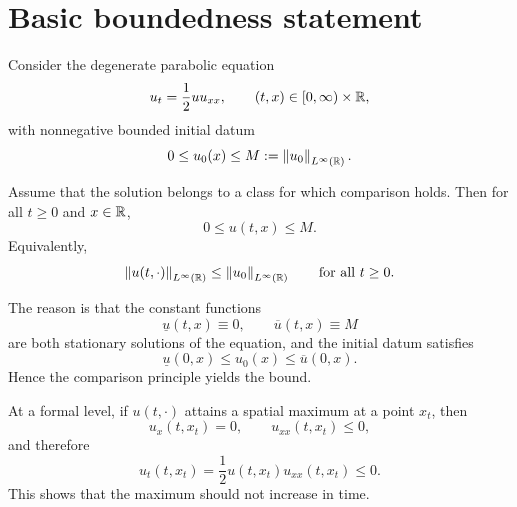 \section{Basic boundedness statement}

Consider the degenerate parabolic equation
\[
    u_t = \frac12 u u_{xx}, \qquad (t,x)\in [0,\infty)\times \mathbb{R},
\]
with nonnegative bounded initial datum
\[
    0\le u_0(x) \le M := \left\lVert u_0 \right\rVert_{L^{\infty}(\mathbb{R})}.
\]

\begin{proposition}
Assume that the solution belongs to a class for which comparison holds. Then for all $t\ge 0$ and $x\in \mathbb{R}$,
\[
    0 \le u(t,x) \le M.
\]
Equivalently,
\[
    \left\lVert u(t,\cdot) \right\rVert_{L^{\infty}(\mathbb{R})} \le \left\lVert u_0 \right\rVert_{L^{\infty}(\mathbb{R})}
    \qquad \text{for all } t\ge 0.
\]
\end{proposition}

The reason is that the constant functions
\[
    \underline{u}(t,x)\equiv 0,
    \qquad
    \overline{u}(t,x)\equiv M
\]
are both stationary solutions of the equation, and the initial datum satisfies
\[
    \underline{u}(0,x) \le u_0(x) \le \overline{u}(0,x).
\]
Hence the comparison principle yields the bound.

\begin{remark}
At a formal level, if $u(t,\cdot)$ attains a spatial maximum at a point $x_t$, then
\[
    u_x(t,x_t)=0, \qquad u_{xx}(t,x_t)\le 0,
\]
and therefore
\[
    u_t(t,x_t)=\frac12 u(t,x_t)u_{xx}(t,x_t)\le 0.
\]
This shows that the maximum should not increase in time.
\end{remark}
